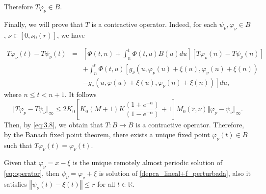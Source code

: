 \documentclass[english,,reqno]{amsart}
\numberwithin{equation}{section}
\theoremstyle{plain}
\theoremstyle{definition}
\theoremstyle{remark}
\begin{document}
Therefore $T\varphi_{\nu}\in B$.

Finally, we will prove that $T$ is a contractive operator.  
Indeed, for each $\psi_{\nu}, \varphi_{\nu} \in B$, $\nu \in [0, \nu_0(r)]$, we have

\begin{eqnarray*}
T\varphi_{\nu}\left(t\right)-T\psi_{\nu}\left(t\right)
&= &  \left[\Phi\left(t,n\right)+\int_{n}^{t}\Phi\left(t,u\right)B\left(u\right)du\right]\left[T\varphi_{\nu}\left(n\right)-T\psi_{\nu}\left(n\right)\right]\\
 & & + \int_{n}^{t}\Phi\left(t,u\right)\left[g_{\nu}\left(u,\varphi_{\nu}\left(u\right)+\xi\left(u\right),\varphi_{\nu}\left(n\right)+\xi\left(n\right)\right)\right.\\
 & & \left. -g_{\nu}\left(u,\varphi\left(u\right)+\xi\left(u\right),\varphi_{\nu}\left(n\right)+\xi\left(n\right)\right)\right]du,\,\,\,\, 
\end{eqnarray*}
where $n\leq t<n+1$. It follows
\[
\Vert T\varphi_{\nu}-T\psi_{\nu}\Vert_{\infty} \leq 2K_{0}\left[K_{0}\left(M+1\right)K\frac{\left(1+e^{-\alpha}\right)}{\left(1-e^{-\alpha}\right)}+1\right] M_{0}\left(\tilde{r},\nu\right)\Vert\varphi_{\nu}-\psi_{\nu}\Vert_{\infty}.
\]
Then, by \eqref{eq:3.8}, we obtain that $T: B \rightarrow B$ is a contractive operator.  
Therefore, by the Banach fixed point theorem, there exists a unique fixed point $\varphi_{\nu}(t) \in B$  
such that $T\varphi_{\nu}(t) = \varphi_{\nu}(t).$

\medskip

Given that $\varphi_{\nu}=x-\xi$ is the unique remotely almost periodic solution of \eqref{eq:operator},
then $\psi_{\nu}=\varphi_{\nu}+\xi$ is solution of \eqref{depca_lineal+f_perturbada}, also it satisfies $\left\Vert \psi_{\nu}\left(t\right)-\xi\left(t\right)\right\Vert \leq r$ for all $t\in\mathbb{R}$.
\end{document}
